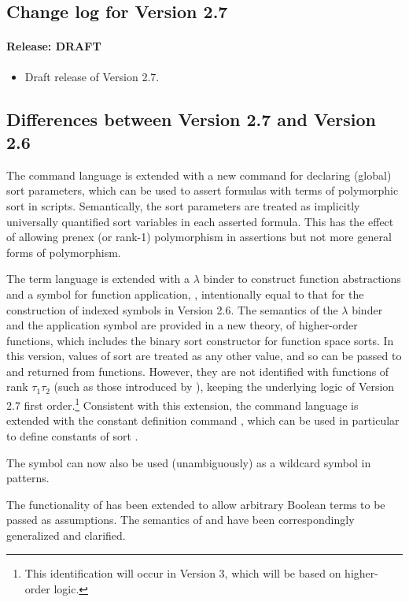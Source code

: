 \begin{newver}
\subsection{Change log for Version 2.7}

\paragraph{Release: DRAFT}
\begin{itemize}
\item %
Draft release of Version 2.7.
\end{itemize}

\subsection{Differences between Version 2.7 and Version 2.6}

The command language is extended with a new command for declaring (global)
sort parameters, which can be used to assert formulas with terms 
of polymorphic sort in scripts.
Semantically, the sort parameters are treated as implicitly universally quantified 
sort variables in each asserted formula.
This has the effect of allowing prenex (or rank-1) polymorphism in assertions 
but not more general forms of polymorphism.

The term language is extended with a $\lambda$ binder to construct 
function abstractions and a symbol for function application, \ter{\_},
intentionally equal to that for the construction of indexed symbols 
in Version 2.6.
The semantics of the $\lambda$ binder and the application symbol are provided
in a new theory, of higher-order functions, which includes 
the binary sort constructor \ter{->} for function space sorts.
In this version, values of sort  are treated as 
any other value, and so can be passed to and returned from functions.
However, they are not identified with functions of rank $\tau_1\tau_2$
(such as those introduced by ),
keeping the underlying logic of Version 2.7 first order.\footnote{%
This identification will occur in Version 3, which will be based 
on higher-order logic.
}
Consistent with this extension, the command language is extended 
with the constant definition command , 
which can be used in particular to define constants 
of sort .

The symbol \ter{\_} can now also be used (unambiguously) as a wildcard symbol 
in  patterns.

The functionality of  has been extended to allow
arbitrary Boolean terms to be passed as assumptions.  The semantics of
 and  have been
correspondingly generalized and clarified.
\end{newver}

